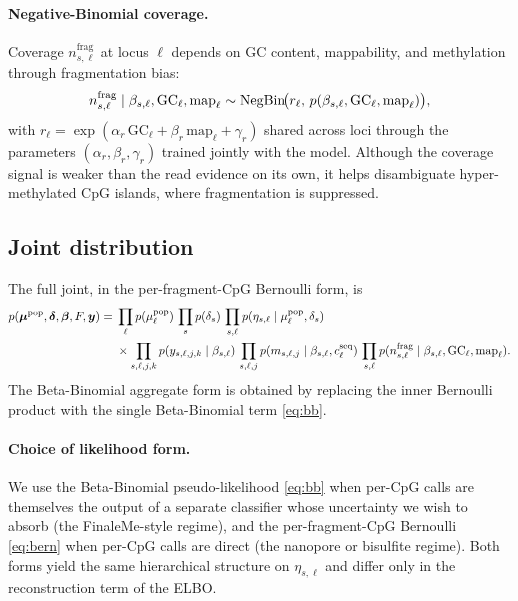 \paragraph{Negative-Binomial coverage.} Coverage $n^{\mathrm{frag}}_{s,\ell}$ at locus $\ell$ depends on GC content, mappability, and methylation through fragmentation bias:
\begin{equation}
n^{\mathrm{frag}}_{s,\ell}\mid \beta_{s,\ell}, \mathrm{GC}_\ell, \mathrm{map}_\ell \sim \mathrm{NegBin}\!\big(r_\ell,\,p(\beta_{s,\ell},\mathrm{GC}_\ell,\mathrm{map}_\ell)\big),
\end{equation}
with $r_\ell=\exp(\alpha_r\,\mathrm{GC}_\ell+\beta_r\,\mathrm{map}_\ell+\gamma_r)$ shared across loci through the parameters $(\alpha_r,\beta_r,\gamma_r)$ trained jointly with the model. Although the coverage signal is weaker than the read evidence on its own, it helps disambiguate hyper-methylated CpG islands, where fragmentation is suppressed.

\subsection{Joint distribution}
The full joint, in the per-fragment-CpG Bernoulli form, is
\begin{align}
p(\bm{\mu}^{\mathrm{pop}},\boldsymbol{\delta},\boldsymbol{\beta},F,\bm{y})
=\;& \prod_\ell p(\mu^{\mathrm{pop}}_\ell)\,
     \prod_s p(\delta_s)\,
     \prod_{s,\ell} p(\eta_{s,\ell}\mid\mu^{\mathrm{pop}}_\ell,\delta_s)\nonumber\\
&\times\prod_{s,\ell,j,k} p(y_{s,\ell,j,k}\mid\beta_{s,\ell})\,
   \prod_{s,\ell,j} p(m_{s,\ell,j}\mid\beta_{s,\ell}, c^{\mathrm{seq}}_\ell)\,
   \prod_{s,\ell} p(n^{\mathrm{frag}}_{s,\ell}\mid\beta_{s,\ell}, \mathrm{GC}_\ell,\mathrm{map}_\ell).
\label{eq:joint}
\end{align}
The Beta-Binomial aggregate form is obtained by replacing the inner Bernoulli product with the single Beta-Binomial term \eqref{eq:bb}.

\paragraph{Choice of likelihood form.} We use the Beta-Binomial pseudo-likelihood \eqref{eq:bb} when per-CpG calls are themselves the output of a separate classifier whose uncertainty we wish to absorb (the FinaleMe-style regime), and the per-fragment-CpG Bernoulli \eqref{eq:bern} when per-CpG calls are direct (the nanopore or bisulfite regime). Both forms yield the same hierarchical structure on $\eta_{s,\ell}$ and differ only in the reconstruction term of the ELBO.

